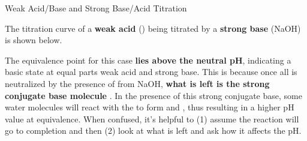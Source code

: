\documentclass[10pt]{article}
\begin{document}
    \begin{core}{Weak Acid/Base and Strong Base/Acid Titration}

      The titration curve of a \textbf{weak acid} () being titrated by a \textbf{strong base} (NaOH) is shown below.


      The equivalence point for this case \textbf{lies above the neutral pH}, indicating a basic state at equal parts weak acid and strong base. This is because once all  is neutralized by the presence of  from NaOH, \textbf{what is left is the strong conjugate base molecule} . In the presence of this strong conjugate base, some water molecules will react with the  to form  and , thus resulting in a higher pH value at equivalence. When confused, it's helpful to (1) assume the reaction will go to completion and then (2) look at what is left and ask how it affects the pH.

    \end{core}
\end{document}
